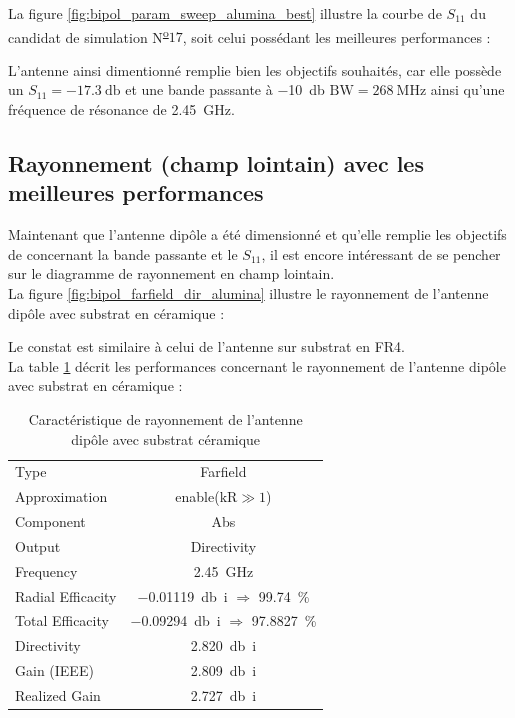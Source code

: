 \documentclass[Deriaz_Traiber_Labo02]{subfiles}
\begin{document}
\pagebreak

La figure \ref{fig:bipol_param_sweep_alumina_best} illustre la courbe de $S_{11}$ du candidat de simulation N\textsuperscript{\underline{o}}$17$, soit celui possédant les meilleures performances :


L'antenne ainsi dimentionné remplie bien les objectifs souhaités, car elle possède un $S_{11} = \SI{-17.3}{\decibel}$ et une bande passante à \SI{-10}{\decibel} $\text{BW} = \SI{268}{\mega\hertz}$ ainsi qu'une fréquence de résonance de \SI{2.45}{\giga\hertz}.

\pagebreak

\subsection{Rayonnement (champ lointain) avec les meilleures performances}

Maintenant que l'antenne dipôle a été dimensionné et qu'elle remplie les objectifs de concernant la bande passante et le $S_{11}$, il est encore intéressant de se pencher sur le diagramme de rayonnement en champ lointain.\\

La figure \ref{fig:bipol_farfield_dir_alumina} illustre le rayonnement de l'antenne dipôle avec substrat en céramique :


Le constat est similaire à celui de l'antenne sur substrat en FR4.\\

La table \ref{tab:ray-alumina} décrit les performances concernant le rayonnement de l'antenne dipôle avec substrat en céramique : 

\begin{table}[H]
\centering
\begin{tabular}{l c}\hline
Type					& Farfield\\
Approximation		& enable($\text{kR}\gg1$)\\
Component			& Abs\\
Output				& Directivity\\
Frequency			& \SI{2.45}{\giga\hertz}\\
Radial Efficacity	& \SI{-0.01119}{\decibel i} $\Rightarrow$ \SI{99.74}{\percent}\\
Total Efficacity		& \SI{-0.09294}{\decibel i} $\Rightarrow$ \SI{97.8827}{\percent}\\
Directivity			& \SI{2.820}{\decibel i}\\
Gain	 (IEEE)			& \SI{2.809}{\decibel i}\\
Realized Gain		& \SI{2.727}{\decibel i}\\\hline
\end{tabular}
\caption{Caractéristique de rayonnement de l'antenne dipôle avec substrat céramique}
\label{tab:ray-alumina}
\end{table}
\end{document}
